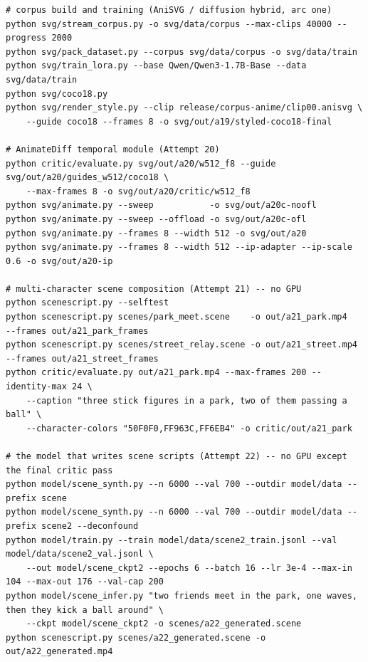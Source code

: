 \documentclass[11pt]{article}
\begin{document}
\begin{verbatim}
# corpus build and training (AniSVG / diffusion hybrid, arc one)
python svg/stream_corpus.py -o svg/data/corpus --max-clips 40000 --progress 2000
python svg/pack_dataset.py --corpus svg/data/corpus -o svg/data/train
python svg/train_lora.py --base Qwen/Qwen3-1.7B-Base --data svg/data/train
python svg/coco18.py
python svg/render_style.py --clip release/corpus-anime/clip00.anisvg \
    --guide coco18 --frames 8 -o svg/out/a19/styled-coco18-final

# AnimateDiff temporal module (Attempt 20)
python critic/evaluate.py svg/out/a20/w512_f8 --guide svg/out/a20/guides_w512/coco18 \
    --max-frames 8 -o svg/out/a20/critic/w512_f8
python svg/animate.py --sweep           -o svg/out/a20c-noofl
python svg/animate.py --sweep --offload -o svg/out/a20c-ofl
python svg/animate.py --frames 8 --width 512 -o svg/out/a20
python svg/animate.py --frames 8 --width 512 --ip-adapter --ip-scale 0.6 -o svg/out/a20-ip

# multi-character scene composition (Attempt 21) -- no GPU
python scenescript.py --selftest
python scenescript.py scenes/park_meet.scene    -o out/a21_park.mp4   --frames out/a21_park_frames
python scenescript.py scenes/street_relay.scene -o out/a21_street.mp4 --frames out/a21_street_frames
python critic/evaluate.py out/a21_park.mp4 --max-frames 200 --identity-max 24 \
    --caption "three stick figures in a park, two of them passing a ball" \
    --character-colors "50F0F0,FF963C,FF6EB4" -o critic/out/a21_park

# the model that writes scene scripts (Attempt 22) -- no GPU except the final critic pass
python model/scene_synth.py --n 6000 --val 700 --outdir model/data --prefix scene
python model/scene_synth.py --n 6000 --val 700 --outdir model/data --prefix scene2 --deconfound
python model/train.py --train model/data/scene2_train.jsonl --val model/data/scene2_val.jsonl \
    --out model/scene_ckpt2 --epochs 6 --batch 16 --lr 3e-4 --max-in 104 --max-out 176 --val-cap 200
python model/scene_infer.py "two friends meet in the park, one waves, then they kick a ball around" \
    --ckpt model/scene_ckpt2 -o scenes/a22_generated.scene
python scenescript.py scenes/a22_generated.scene -o out/a22_generated.mp4


\end{verbatim}
\end{document}
